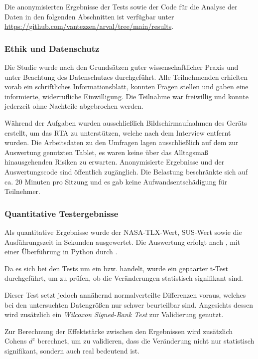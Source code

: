 Die anonymisierten Ergebnisse der Tests sowie der Code für die Analyse der Daten in den folgenden Abschnitten ist verfügbar unter \url{https://github.com/vantezzen/arval/tree/main/results}.

\subsubsection{Ethik und Datenschutz}

Die Studie wurde nach den Grundsätzen guter wissenschaftlicher Praxis und unter Beachtung des Datenschutzes durchgeführt. Alle Teilnehmenden erhielten vorab ein schriftliches Informationsblatt, konnten Fragen stellen und gaben eine informierte, widerrufliche Einwilligung. Die Teilnahme war freiwillig und konnte jederzeit ohne Nachteile abgebrochen werden.

Während der Aufgaben wurden ausschließlich Bildschirmaufnahmen des Geräts erstellt, um das RTA zu unterstützen, welche nach dem Interview entfernt wurden. Die Arbeitsdaten zu den Umfragen lagen ausschließlich auf dem zur Auswertung genutzten Tablet, es waren keine über das Alltagsmaß hinausgehenden Risiken zu erwarten. Anonymisierte Ergebnisse und der Auswertungscode sind öffentlich zugänglich. Die Belastung beschränkte sich auf ca. 20 Minuten pro Sitzung und es gab keine Aufwandsentschädigung für Teilnehmer.

\subsubsection{Quantitative Testergebnisse}

Als quantitative Ergebnisse wurde der NASA-TLX-Wert, SUS-Wert sowie die Ausführungszeit in Sekunden ausgewertet. Die Auswertung erfolgt nach \textcite{pennstateuniversitySTAT415Introduction2025}, mit einer Überführung in Python durch \textcite{kumarPracticalStatisticsData2020a}.

Da es sich bei den Tests um ein  bzw.  handelt, wurde ein gepaarter t-Test durchgeführt, um zu prüfen, ob die Veränderungen statistisch signifikant sind.

Dieser Test setzt jedoch annähernd normalverteilte Differenzen voraus, welches bei den untersuchten Datengrößen nur schwer beurteilbar sind. Angesichts dessen wird zusätzlich ein \textit{Wilcoxon Signed-Rank Test} zur Validierung genutzt. 

Zur Berechnung der Effektstärke zwischen den Ergebnissen wird zusätzlich Cohens $d^z$ berechnet, um zu validieren, dass die Veränderung nicht nur statistisch signifikant, sondern auch real bedeutend ist.

